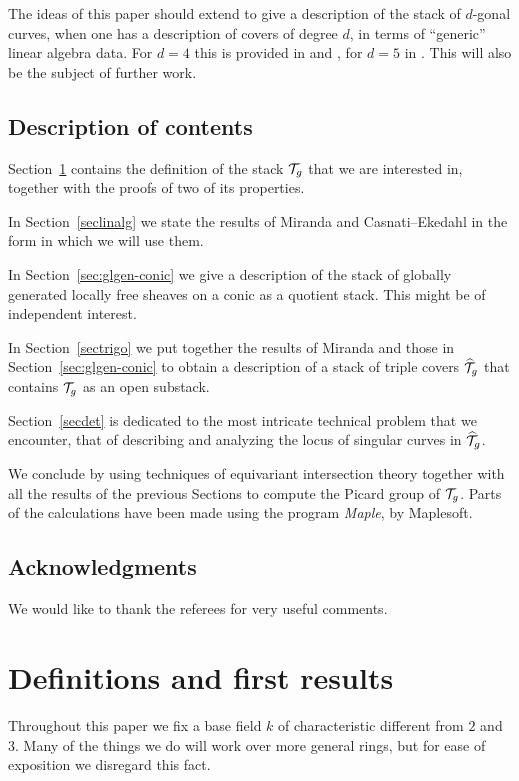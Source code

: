 \documentclass{amsart}
\numberwithin{equation}{section}
\numberwithin{subsection}{section}
\theoremstyle{definition}
\theoremstyle{remark}
\newcommand{\T}[1][g]{\cT_{#1}}
\newcommand{\OT}[1][g]{\widehat{\cT}_{#1}}
\begin{document}
The ideas of this paper should extend to give a description of the stack of $d$-gonal curves, when one has a description of covers of degree $d$, in terms of ``generic'' linear algebra data. For $d = 4$ this is provided in \cite{caseke} and \cite{miranda-hahn-quadruple}, for $d = 5$ in \cite{casnati-degree5}. This will also be the subject of further work.

\subsection*{Description of contents}

Section~\ref{sec:definitions} contains the definition of the stack $\T$ that we are interested in, together with the proofs of two of its properties.

In Section~\ref{seclinalg} we state the results of Miranda and Casnati--Ekedahl in the form in which we will use them.

In Section~\ref{sec:glgen-conic} we give a description of the stack of globally generated locally free sheaves on a conic as a quotient stack. This might be of independent interest.

In Section~\ref{sectrigo} we put together the results of Miranda and those in Section~\ref{sec:glgen-conic} to obtain a description of a stack of triple covers $\OT$ that contains $\T$ as an open substack.

Section~\ref{secdet} is dedicated to the most intricate technical problem that we encounter, that of describing and analyzing the locus of singular curves in $\OT$. 

We conclude by using techniques of equivariant intersection theory together with all the results of the previous Sections to compute the Picard group of $\T$. Parts of the calculations have been made using the program \emph{Maple}, by Maplesoft.

\subsection*{Acknowledgments} We would like to thank the referees for very useful comments.


\section{Definitions and first results}\label{sec:definitions}

Throughout this paper we fix a base field $k$ of characteristic different from $2$ and $3$. Many of the things we do will work over more general rings, but for ease of exposition we disregard this fact.
\end{document}
